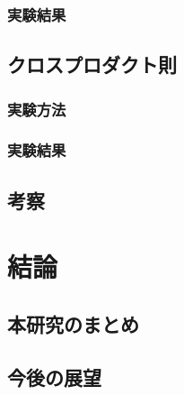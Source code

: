 \subsubsection{実験結果}

\newpage

\subsection{クロスプロダクト則}
\subsubsection{実験方法}
\subsubsection{実験結果}

\subsection{考察}

\newpage
\section{結論}
\subsection{本研究のまとめ}
\subsection{今後の展望}